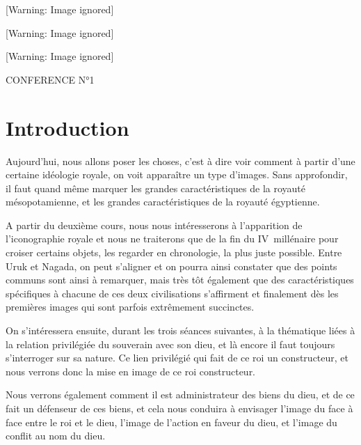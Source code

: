 \documentclass[a4paper,10pt]{article}
\begin{document}
\begin{center}
 [Warning: Image ignored] %

\end{center}
\begin{center}
 [Warning: Image ignored] %

\end{center}
\begin{center}
 [Warning: Image ignored] %

\end{center}
CONFERENCE N°1  


\section{Introduction}

Aujourd'hui, nous allons poser les choses, c'est à dire voir comment 
à partir d'une certaine idéologie royale, on voit apparaître un type 
d'images. Sans approfondir,  il faut quand même marquer les grandes 
caractéristiques de la royauté mésopotamienne, et les grandes 
caractéristiques de la royauté égyptienne.

A partir du deuxième cours, nous nous intéresserons à l'apparition de 
l'iconographie royale et nous ne traiterons que de la fin du 
IV\ieme~millénaire pour croiser certains objets, les regarder en 
chronologie, la plus juste possible.
Entre Uruk et Nagada, on peut s'aligner et on pourra ainsi constater 
que des points communs sont ainsi à remarquer, mais très tôt également 
que des caractéristiques spécifiques à chacune de ces deux 
civilisations s'affirment et finalement dès les premières images qui 
sont parfois extrêmement succinctes.

On s'intéressera ensuite, durant les trois séances suivantes, à la 
thématique liées à la relation privilégiée du souverain avec son dieu, 
et là encore il faut toujours s'interroger sur sa nature. Ce lien 
privilégié qui fait de ce roi un constructeur, et nous verrons donc 
la mise en image de ce roi constructeur.

Nous verrons également comment il est administrateur des biens du 
dieu, et de ce fait un défenseur de ces biens, et cela nous conduira 
à envisager l'image du face à face entre le roi et le dieu, l'image 
de l'action en faveur du dieu, et l'image du conflit au nom du dieu.
\end{document}
